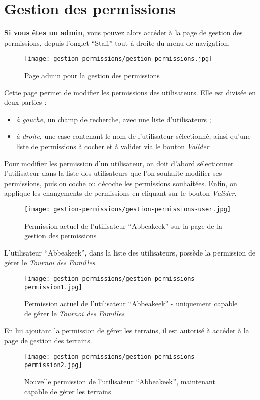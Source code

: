\section{Gestion des permissions}

\textbf{Si vous êtes un admin}, vous pouvez alors accéder à la page de gestion des permissions, depuis l'onglet \enquote{Staff} tout à droite du menu de navigation.

\begin{figure}[H]
\centering
\texttt{[image: gestion-permissions/gestion-permissions.jpg]}
\caption{Page admin pour la gestion des permissions}
\end{figure}

Cette page permet de modifier les permissions des utilisateurs. Elle est divisée en deux parties :

\begin{itemize}
\item \textit{à gauche}, un champ de recherche, avec une liste d'utilisateurs ;
\item \textit{à droite}, une case contenant le nom de l'utilisateur sélectionné, ainsi qu'une liste de permissions à cocher et à valider via le bouton \textit{Valider}
\end{itemize}
\bigskip

Pour modifier les permission d'un utilisateur, on doit d'abord sélectionner l'utilisateur dans la liste des utilisateurs que l'on souhaite modifier ses permissions, puis on coche ou décoche les permissions souhaitées. Enfin, on applique les changements de permissions en cliquant sur le bouton \textit{Valider}.\newline

\begin{figure}[H]
\centering
\texttt{[image: gestion-permissions/gestion-permissions-user.jpg]}
\caption{Permission actuel de l'utilisateur \enquote{Abbeakeek} sur la page de la gestion des permissions}
\end{figure}

L'utilisateur \enquote{Abbeakeek}, dans la liste des utilisateurs, possède la permission de gérer le \textit{Tournoi des Familles}.

\begin{figure}[H]
\centering
\texttt{[image: gestion-permissions/gestion-permissions-permission1.jpg]}
\caption{Permission actuel de l'utilisateur \enquote{Abbeakeek} - uniquement capable de gérer le \textit{Tournoi des Familles}}
\end{figure}

En lui ajoutant la permission de gérer les terrains, il est autorisé à accéder à la page de gestion des terrains.

\begin{figure}[H]
\centering
\texttt{[image: gestion-permissions/gestion-permissions-permission2.jpg]}
\caption{Nouvelle permission de l'utilisateur \enquote{Abbeakeek}, maintenant capable de gérer les terrains}
\end{figure}

